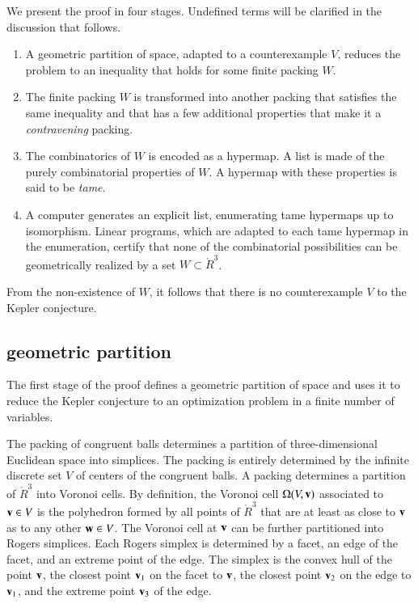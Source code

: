 We present the proof in four stages.  Undefined terms will be clarified in the
discussion that follows.

\begin{enumerate}
\item A geometric partition of space, adapted to a counterexample $V$, 
reduces the problem to an inequality that holds for some finite packing $W$.
\item The finite packing $W$ is transformed into another packing that satisfies the same
inequality and that has a few additional properties that make it a {\it contravening} packing.
\item The combinatorics of $W$ is encoded as a hypermap.  A list is
  made of the purely combinatorial properties of $W$.  A hypermap with
  these properties is said to be {\it tame}.
\item A computer generates an explicit list, enumerating
  tame hypermaps up to isomorphism.  Linear programs, which are
  adapted to each tame hypermap in the enumeration, certify that
  none of the combinatorial possibilities can be geometrically realized by a set
  $W\subset \ring{R}^3$.
\end{enumerate}

From the non-existence of $W$, it follows that there is no
counterexample $V$ to the Kepler conjecture.



\subsection{geometric partition}

The first stage of the proof defines a geometric partition of space
and uses it to reduce the Kepler conjecture to an optimization problem
in a finite number of variables.

The packing of congruent balls determines a partition of
three-dimensional Euclidean space into simplices.  The packing is
entirely determined by the infinite discrete set $V$ of centers of the
congruent balls.  A packing determines a partition of $\ring{R}^3$
into Voronoi cells.  By definition, the Voronoi cell $\Omega(V,{\mathbf v})$
associated to ${\mathbf v}\in V$ is the polyhedron formed by all points of
$\ring{R}^3$ that are at least as close to ${\mathbf v}$ as to any other ${\mathbf w}\in
V$.  The Voronoi cell at ${\mathbf v}$ can be further partitioned into Rogers
simplices.  Each Rogers simplex is determined by a facet, an edge of
the facet, and an extreme point of the edge.  The simplex is the
convex hull of the point ${\mathbf v}$, the closest point ${\mathbf v}_1$ on the facet
to ${\mathbf v}$, the closest point ${\mathbf v}_2$ on the edge to ${\mathbf v}_1$, and the
extreme point ${\mathbf v}_3$ of the edge.


